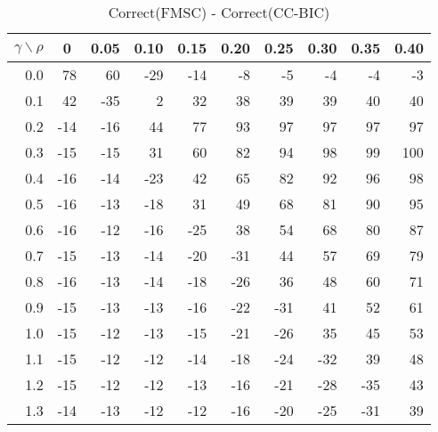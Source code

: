 \documentclass[12pt]{article}
\begin{document}
\begin{table}[!tbp]
\caption{Correct(FMSC) - Correct(CC-BIC)}
 \begin{center}
 \begin{tabular}{r|rrrrrrrrr}\hline\hline
\multicolumn{1}{c|}{$\gamma\backslash\rho$}&\multicolumn{1}{c}{0}&\multicolumn{1}{c}{0.05}&\multicolumn{1}{c}{0.10}&\multicolumn{1}{c}{0.15}&\multicolumn{1}{c}{0.20}&\multicolumn{1}{c}{0.25}&\multicolumn{1}{c}{0.30}&\multicolumn{1}{c}{0.35}&\multicolumn{1}{c}{0.40}\tabularnewline
\hline


0.0& 78& 60&-29&-14& -8& -5& -4& -4& -3\tabularnewline
0.1& 42&-35&  2& 32& 38& 39& 39& 40& 40\tabularnewline
0.2&-14&-16& 44& 77& 93& 97& 97& 97& 97\tabularnewline
0.3&-15&-15& 31& 60& 82& 94& 98& 99&100\tabularnewline
0.4&-16&-14&-23& 42& 65& 82& 92& 96& 98\tabularnewline
0.5&-16&-13&-18& 31& 49& 68& 81& 90& 95\tabularnewline
0.6&-16&-12&-16&-25& 38& 54& 68& 80& 87\tabularnewline
0.7&-15&-13&-14&-20&-31& 44& 57& 69& 79\tabularnewline
0.8&-16&-13&-14&-18&-26& 36& 48& 60& 71\tabularnewline
0.9&-15&-13&-13&-16&-22&-31& 41& 52& 61\tabularnewline
1.0&-15&-12&-13&-15&-21&-26& 35& 45& 53\tabularnewline
1.1&-15&-12&-12&-14&-18&-24&-32& 39& 48\tabularnewline
1.2&-15&-12&-12&-13&-16&-21&-28&-35& 43\tabularnewline
1.3&-14&-13&-12&-12&-16&-20&-25&-31& 39\tabularnewline
\hline
\end{tabular}

\end{center}

\end{table}

%
\end{document}
